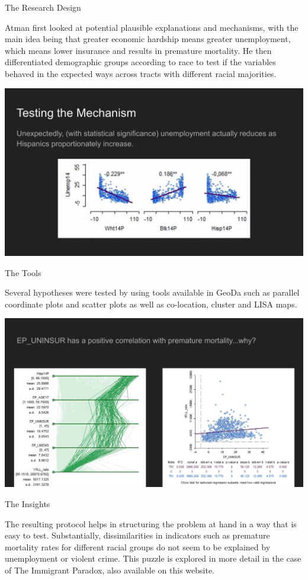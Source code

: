 \documentclass[
]{book}
\begin{document}
The Research Design

Atman first looked at potential plausible explanations and mechanisms, with the main idea being that greater economic hardship means greater unemployment, which means lower insurance and results in premature mortality. He then differentiated demographic groups according to race to test if the variables behaved in the expected ways across tracts with different racial majorities.

\includegraphics{images/health3.png}

The Tools

Several hypotheses were tested by using tools available in GeoDa such as parallel coordinate plots and scatter plots as well as co-location, cluster and LISA maps.

\includegraphics{images/health4.png}

The Insights

The resulting protocol helps in structuring the problem at hand in a way that is easy to test. Substantially, dissimilarities in indicators such as premature mortality rates for different racial groups do not seem to be explained by unemployment or violent crime. This puzzle is explored in more detail in the case of The Immigrant Paradox, also available on this website.
\end{document}
